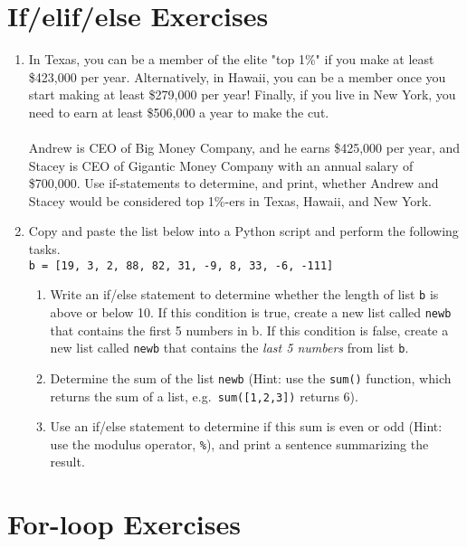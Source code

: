 \documentclass{article}[12pt]
\newcommand{\code}[1]{\texttt{#1}}  %
\begin{document}
\vspace{2.25cm}

\section{If/elif/else Exercises}

\begin{enumerate}[itemsep=5ex]
	\item In Texas, you can be a member of the elite "top 1\%" if you make at least \$423,000 per year. Alternatively, in Hawaii, you can be a member once you start making at least \$279,000 per year! Finally, if you live in New York, you need to earn at least \$506,000 a year to make the cut. \\\\ Andrew is CEO of Big Money Company, and he earns \$425,000 per year, and Stacey is CEO of Gigantic Money Company with an annual salary of \$700,000. Use if-statements to determine, and print, whether Andrew and Stacey would be considered top 1\%-ers in Texas, Hawaii, and New York.
	
	\item Copy and paste the list below into a Python script and perform the following tasks. \\ \code{b = [19, 3, 2, 88, 82, 31, -9, 8, 33, -6, -111]} 
	\begin{enumerate}[itemsep=2ex]
		\item Write an if/else statement to determine whether the length of list \code{b} is above or below 10. If this condition is true, create a new list called \code{newb} that contains the first 5 numbers in b. If this condition is false, create a new list called \code{newb} that contains the \emph{last 5 numbers} from list \code{b}. 
		\item Determine the sum of the list \code{newb} (Hint: use the \code{sum()} function, which returns the sum of a list, e.g.\ \code{sum([1,2,3])} returns 6).
		\item Use an if/else statement to determine if this sum is even or odd (Hint: use the modulus operator, \code{\%}), and print a sentence summarizing the result.
	\end{enumerate}

	
		   
\end{enumerate}
			
\vspace{2.25cm}

\section{For-loop Exercises}
\end{document}
